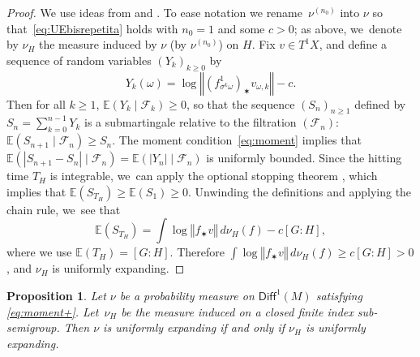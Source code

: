 \documentclass[JEP,XML,SOM,Unicode,published]{cedram}
\newcommand{\norm}[1]{{\left\Vert#1\right\Vert}}
\newcommand{\abs}[1]{\left\vert#1\right\vert}
\newcommand{\ee}{\mathbb{E}}
\newcommand\Diff{{\mathsf{Diff}}}
\theoremstyle{plain}
\newtheorem{pro}[thm]{Proposition}
\theoremstyle{definition}
\begin{document}
\begin{proof} We use ideas from \cite[\S 4.3]{liu_thesis} and \cite[Prop.\,2.2]{chung}.
To ease notation we rename~$\nu^{(n_0)}$ into $\nu$ so that~\eqref{eq:UEbisrepetita} holds with $n_0= 1$ and some $c>0$; as above, we~denote by $\nu_H$ the measure induced by $\nu$ (\ie by $\nu^{(n_0)}$) on $H$. Fix
$ v\in T^1X$, and
define a sequence of random variables $(Y_k)_{k\geq 0}$ by
\begin{equation*}
Y_k(\omega) = \log\norm{ (f^1_{\sigma^k\omega})_\varstar v_{\omega, k}}- c.
\end{equation*}
Then for all $k\geq 1$,
$\ee({Y_{k}\mid \mathcal F_{k}})\geq 0$, so that the sequence $(S_n)_{n\geq 1}$
defined by $ S_n = \sum_{k=0}^{n-1} Y_k$ is a submartingale
relative to the filtration $(\mathcal F_n)$: $\ee( S_{n+1}\mid \mathcal F_n)\geq S_{n}$.
The moment condition~\eqref{eq:moment} implies that
$\ee(\abs{S_{n+1}-S_n}\mid \mathcal F_n) = \ee(\abs{Y_n}\mid \mathcal F_n)$ is uniformly bounded.
Since the hitting time $T_H$ is integrable, we~can apply the optional stopping theorem \cite[Th.\,4.7.5]{durrett_book}, which implies that
$\ee(S_{T_H})\geq \ee(S_1)\geq 0$. Unwinding the definitions and applying the chain rule, we~see that
\begin{equation*}
\ee(S_{T_H}) = \int \log \norm{ f_\varstar v}\, d\nu_H(f) - c [G:H],
\end{equation*}
where we use $\ee (T_H) = [G:H]$. Therefore
$\int \log \norm{f_\varstar v}\, d\nu_H(f) \geq c [G:H]>0$, and
$\nu_H$ is uniformly expanding.
\end{proof}

\begin{pro}\label{pro:induced_UE2}
Let $\nu$ be a probability measure on $\Diff^1(M)$ satisfying \eqref{eq:moment+}. Let~$\nu_H$ be the measure induced on a closed
finite index sub-semigroup. Then $\nu$ is uniformly expanding if and only if $\nu_H$ is uniformly expanding.
\end{pro}
\end{document}
